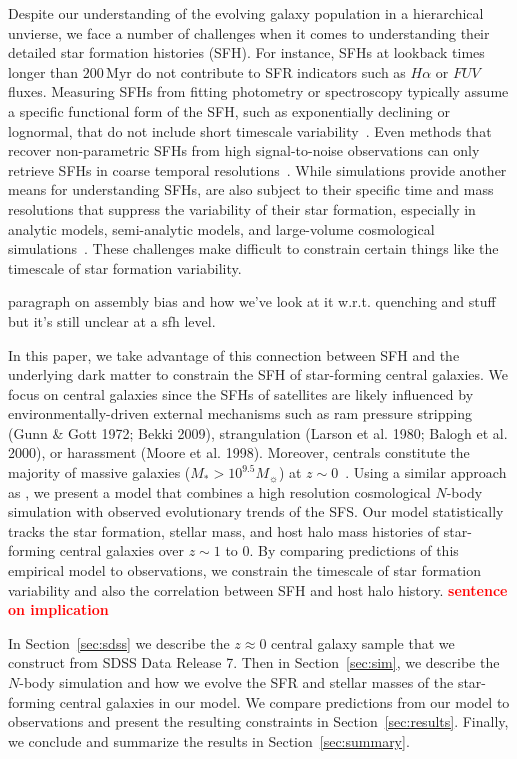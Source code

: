 \documentclass[12pt, letterpaper, preprint, tighten]{aastex62}
\newcommand{\todo}[1]{{\bf \textcolor{red}{#1}}}
\newcommand{\ch}[1]{\color{orange}{\bf CH:} #1}
\begin{document}
Despite our understanding of the evolving galaxy population in a
hierarchical unvierse, we face a number of challenges when it comes 
to understanding their detailed star formation histories (SFH). 
For instance, SFHs at lookback times longer than $200\,\mathrm{Myr}$ 
do not contribute to SFR indicators such as $H\alpha$ or $FUV$ fluxes.
Measuring SFHs from fitting photometry or spectroscopy typically 
assume a specific functional form of the SFH, such as exponentially 
declining or lognormal, that do not include short timescale 
variability~\citep[\emph{e.g.}][]{wilkinson2017, carnall2018}. 
Even methods that recover non-parametric SFHs from high signal-to-noise 
observations can only retrieve SFHs in coarse temporal resolutions~\citep[\emph{e.g.}][]{tojeiro2009, leja2018a}. 
While simulations provide another means for understanding SFHs, 
are also subject to their specific time and mass resolutions that 
suppress the variability of their star formation, especially in 
analytic models, semi-analytic models, and large-volume cosmological 
simulations~\citep{sparre2017a}. These challenges make difficult to constrain certain things like 
the timescale of star formation variability.

{\ch paragraph on assembly bias and how we've look at it w.r.t. 
quenching and stuff but it's still unclear at a sfh level}.

In this paper, we take advantage of this connection between SFH and 
the underlying dark matter to constrain the SFH of star-forming central 
galaxies. We focus on central galaxies since the SFHs of satellites 
are likely influenced by environmentally-driven external mechanisms 
such as ram pressure stripping (Gunn \& Gott 1972; Bekki 2009), 
strangulation (Larson et al. 1980; Balogh et al. 2000), or 
harassment (Moore et al. 1998). Moreover, centrals constitute the 
majority of massive galaxies ($M_*>10^{9.5}M_\sun$) at 
$z\sim0$~\citep{wetzel2013}. Using a similar approach as \cite{wetzel2013, hahn2017}, 
we present a model that combines a high resolution cosmological 
$N$-body simulation with observed evolutionary trends of the SFS. 
Our model statistically tracks the star formation, stellar mass, 
and host halo mass histories of star-forming central galaxies over 
$z\sim1$ to $0$. By comparing predictions of this empirical 
model to observations, we constrain the timescale of star formation 
variability and also the correlation between SFH and host halo history.  
\todo{sentence on implication}

In Section~\ref{sec:sdss} we describe the $z\approx0$ central galaxy 
sample that we construct from SDSS Data Release 7. Then in 
Section~\ref{sec:sim}, we describe the $N$-body simulation and how we
evolve the SFR and stellar masses of the star-forming central galaxies 
in our model. We compare predictions from our model to observations 
and present the resulting constraints in Section~\ref{sec:results}. 
Finally, we conclude and summarize the results in 
Section~\ref{sec:summary}.
\end{document}
